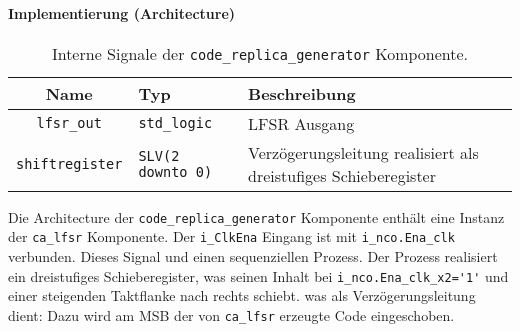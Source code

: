 
\paragraph{Implementierung (Architecture)}

\begin{table}[htbp]
    \ttabbox
    {
        \caption[Code Replika Generator interne Signale]{Interne Signale der \lstinline$code_replica_generator$ Komponente.}
        \label{TabCodeGen_ArchSignals}
    }
    {
    \begin{tabular}{c  p{2cm} p{6cm}}
        \toprule
        Name      & Typ         & Beschreibung \\
        \midrule
        \lstinline$lfsr_out$  & \lstinline$std_logic$             & LFSR Ausgang\\
        \lstinline$shiftregister$  & \lstinline$SLV(2 downto 0)$             &  Verzögerungsleitung realisiert als dreistufiges Schieberegister\\
        \bottomrule
    \end{tabular}
}
\end{table}

Die Architecture der \lstinline$code_replica_generator$ Komponente enthält eine Instanz der \lstinline$ca_lfsr$ Komponente. Der \lstinline$i_ClkEna$ Eingang ist mit \lstinline$i_nco.Ena_clk$ verbunden. Dieses Signal 
und einen sequenziellen Prozess. Der Prozess realisiert ein dreistufiges Schieberegister, was seinen Inhalt bei \lstinline$i_nco.Ena_clk_x2='1'$ und einer steigenden Taktflanke nach rechts schiebt. 
was als Verzögerungsleitung dient: Dazu wird am MSB der von \lstinline$ca_lfsr$ erzeugte Code eingeschoben. 
